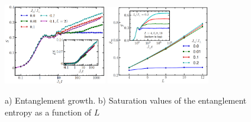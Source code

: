 \begin{figure}[h]
    \centering
    \includegraphics[width=0.4\textwidth]{imgs/S_FV_12a.png}
    \hspace{10 mm} 
    \includegraphics[width=0.4\textwidth]{imgs/S_FV_12b.png}
    \caption{a) Entanglement growth. b) Saturation values of the entanglement entropy as a function of $L$}
\end{figure}
